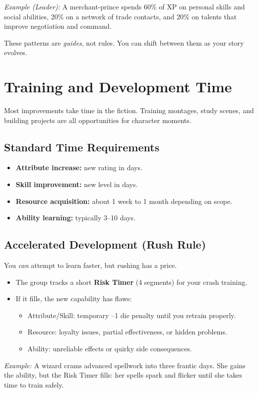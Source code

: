 \noindent\textit{Example (Leader):} A merchant-prince spends 60\% of XP on personal
skills and social abilities, 20\% on a network of trade contacts, and 20\% on
talents that improve negotiation and command.

These patterns are \emph{guides}, not rules. You can shift between them as your
story evolves.

\section{Training and Development Time}
\label{sec:training-time}

Most improvements take time in the fiction. Training montages, study scenes,
and building projects are all opportunities for character moments.

\subsection{Standard Time Requirements}
\label{sec:standard-training}
\begin{itemize}
  \item \textbf{Attribute increase:} new rating in days.
  \item \textbf{Skill improvement:} new level in days.
  \item \textbf{Resource acquisition:} about 1 week to 1 month depending on scope.
  \item \textbf{Ability learning:} typically 3--10 days.
\end{itemize}

\subsection{Accelerated Development (Rush Rule)}
\label{sec:rush-rule}
You \emph{can} attempt to learn faster, but rushing has a price.
\begin{itemize}
  \item The group tracks a short \textbf{Risk Timer } (4 segments) for your crash training.
  \item If it fills, the new capability has flaws:
    \begin{itemize}
      \item Attribute/Skill: temporary --1 die penalty until you retrain properly.
      \item Resource: loyalty issues, partial effectiveness, or hidden problems.
      \item Ability: unreliable effects or quirky side consequences.
    \end{itemize}
\end{itemize}
\noindent\textit{Example:} A wizard crams advanced spellwork into three frantic days.
She gains the ability, but the Risk Timer fills: her spells spark and flicker
until she takes time to train safely.

